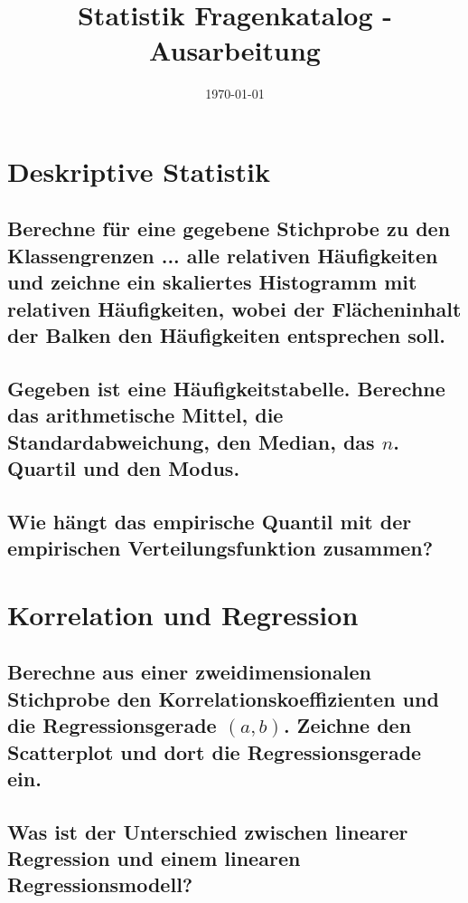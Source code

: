 \documentclass[a4paper,10pt]{article}
\title{Statistik Fragenkatalog - Ausarbeitung }
\author{}
\date{\today}
\begin{document}
  \maketitle
  \newpage
  \tableofcontents{}
  \newpage
\section{Deskriptive Statistik}
\subsection{Berechne für eine gegebene Stichprobe zu den Klassengrenzen ... alle relativen Häufigkeiten und zeichne ein skaliertes Histogramm mit relativen Häufigkeiten, wobei der Flächeninhalt der Balken den Häufigkeiten entsprechen soll.}

\subsection{Gegeben ist eine Häufigkeitstabelle.
Berechne das arithmetische Mittel, die Standardabweichung, den Median, das $n$. Quartil und den Modus.}

\subsection{Wie hängt das empirische Quantil mit der empirischen Verteilungsfunktion zusammen?}

\newpage
\section{Korrelation und Regression}
\subsection{Berechne aus einer zweidimensionalen Stichprobe den Korrelationskoeffizienten und die Regressionsgerade $(a, b)$. Zeichne den Scatterplot und dort die Regressionsgerade ein.}

\subsection{Was ist der Unterschied zwischen linearer Regression und einem linearen Regressionsmodell?}
\end{document}
